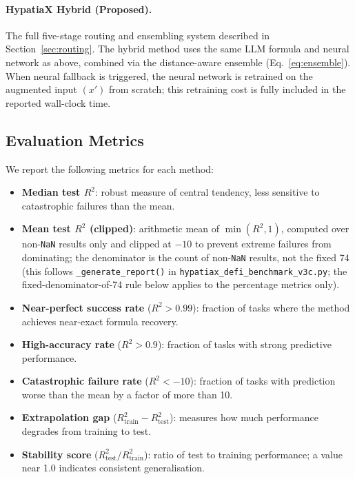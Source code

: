 \documentclass[twoside,11pt]{article}
\newcommand{\Rsq}{R^{2}}
\newcommand{\Rtrain}{R^{2}_{\mathrm{train}}}
\newcommand{\Rtest}{R^{2}_{\mathrm{test}}}
\begin{document}
\paragraph{HypatiaX Hybrid (Proposed).}
The full five-stage routing and ensembling system described in Section~\ref{sec:routing}.
The hybrid method uses the same LLM formula and neural network as above, combined via
the distance-aware ensemble (Eq.~\ref{eq:ensemble}).  When neural fallback is triggered,
the neural network is retrained on the augmented input $(x')$ from scratch; this
retraining cost is fully included in the reported wall-clock time.

\subsection{Evaluation Metrics}\label{subsec:evaluation-metrics}
\label{sec:setup_metrics}

We report the following metrics for each method:
\begin{itemize}
  \item \textbf{Median test $\Rsq$}: robust measure of central tendency, less
    sensitive to catastrophic failures than the mean.
  \item \textbf{Mean test $\Rsq$ (clipped)}: arithmetic mean of $\min(\Rsq, 1)$,
    computed over non-\texttt{NaN} results only and clipped at $-10$ to prevent extreme failures from
    dominating; the denominator is the count of non-\texttt{NaN} results, not the fixed 74 (this follows
    \texttt{\_generate\_report()} in \texttt{hypatiax\_defi\_benchmark\_v3c.py}; the fixed-denominator-of-74 rule below
    applies to the percentage metrics only).
  \item \textbf{Near-perfect success rate} ($\Rsq > 0.99$): fraction of tasks where
    the method achieves near-exact formula recovery.
  \item \textbf{High-accuracy rate} ($\Rsq > 0.9$): fraction of tasks with strong
    predictive performance.
  \item \textbf{Catastrophic failure rate} ($\Rsq < -10$): fraction of tasks with
    prediction worse than the mean by a factor of more than 10.
  \item \textbf{Extrapolation gap} ($\Rtrain - \Rtest$): measures how much
    performance degrades from training to test.
  \item \textbf{Stability score} ($\Rtest / \Rtrain$): ratio of test to training
    performance; a value near 1.0 indicates consistent generalisation.
\end{itemize}
\end{document}
